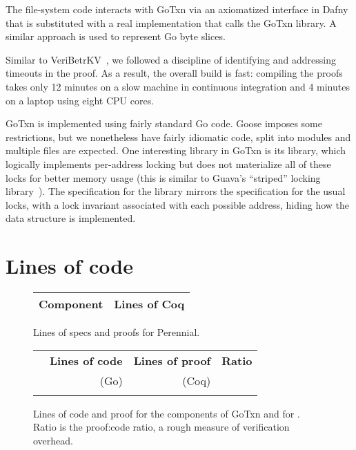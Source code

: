 The file-system code interacts with GoTxn via an axiomatized interface in Dafny
that is substituted with a real implementation that calls the GoTxn library. A
similar approach is used to represent Go byte slices.

Similar to VeriBetrKV~\cite{hance:veribetrkv}, we followed a
discipline of identifying and addressing timeouts in the proof.
As a result, the overall
build is fast: compiling the proofs takes only 12 minutes on a slow
machine in continuous integration and 4 minutes on a laptop
using eight CPU cores.


GoTxn is implemented using fairly standard Go code. Goose imposes some
restrictions, but we nonetheless have fairly idiomatic code, split into modules
and multiple files are expected. One interesting library in GoTxn is its
 library, which logically implements per-address locking but does
not materialize all of these locks for better memory usage (this is similar to
Guava's ``striped'' locking library~\cite{guava-striped}). The specification for
the library mirrors the specification for the usual locks, with a lock invariant
associated with each possible address, hiding how the data structure is
implemented.

\section{Lines of code}

\begin{figure}
\centering
\small
\begin{tabular}{lr}
\toprule
\bf Component & \bf Lines of Coq \\
\midrule
  
\end{tabular}
\caption{Lines of specs and proofs for Perennial.}
\label{fig:perennial:lines}
\end{figure}

\begin{figure}
\centering
\small
\begin{tabular}{lrrr}
\toprule
  & \bf Lines of code & \bf Lines of proof & \bf Ratio \\
  & (Go) & (Coq) & \\
\midrule
   \\
\bottomrule
\end{tabular}
\caption{Lines of code and proof for the components of GoTxn and for
\simplenfs. Ratio is the proof:code ratio, a rough measure of verification overhead.}
\label{fig:txn:loc}
\end{figure}


